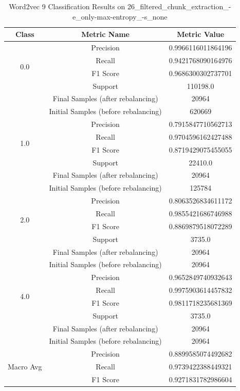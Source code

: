 \begin{longtable}{|c|c|c|}
\caption{Word2vec 9 Classification Results on 26\_filtered\_chunk\_extraction\_-e\_only-max-entropy\_-s\_none} \label{tab:26_filtered_chunk_extraction_-e_only-max-entropy_-s_none_word2vec_9_classifiers_results} \\
\hline
Class & Metric Name & Metric Value \\
\hline
\multirow{4}{*}{0.0} & Precision & 0.9966116011864196 \\
 & Recall & 0.9421768090164976 \\
 & F1 Score & 0.9686300302737701 \\
 & Support & 110198.0 \\
 & Final Samples (after rebalancing) & 20964 \\
 & Initial Samples (before rebalancing) & 620669 \\
\hline
\multirow{4}{*}{1.0} & Precision & 0.7915847710562713 \\
 & Recall & 0.9704596162427488 \\
 & F1 Score & 0.8719429075455055 \\
 & Support & 22410.0 \\
 & Final Samples (after rebalancing) & 20964 \\
 & Initial Samples (before rebalancing) & 125784 \\
\hline
\multirow{4}{*}{2.0} & Precision & 0.8063526834611172 \\
 & Recall & 0.9855421686746988 \\
 & F1 Score & 0.8869879518072289 \\
 & Support & 3735.0 \\
 & Final Samples (after rebalancing) & 20964 \\
 & Initial Samples (before rebalancing) & 20964 \\
\hline
\multirow{4}{*}{4.0} & Precision & 0.9652849740932643 \\
 & Recall & 0.9975903614457832 \\
 & F1 Score & 0.9811718235681369 \\
 & Support & 3735.0 \\
 & Final Samples (after rebalancing) & 20964 \\
 & Initial Samples (before rebalancing) & 20964 \\
\hline
\multirow{4}{*}{Macro Avg} & Precision & 0.8899585074492682 \\
 & Recall & 0.9739422388449321 \\
 & F1 Score & 0.9271831782986604 \\

\end{longtable}
